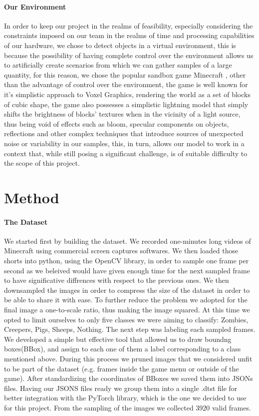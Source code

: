 \documentclass[10pt,journal,cspaper,compsoc]{IEEEtran}
\begin{document}
    \paragraph*{Our Environment}
    In order to keep our project in the realms of feasibility, especially considering the constraints imposed on our team in the 
    realms of time and processing capabilities of our hardware, we chose to detect objects in a virtual environment, this is because 
    the possibility of having complete control over the environment allows us to artificially create scenarios from which we can gather 
    samples of a large quantity, for this reason, we chose the popular sandbox game Minecraft \cite{Mojang-Minecraft}, other than 
    the advantage of control over the environment, the game is well known for it's simplistic approach to Voxel Graphics, rendering 
    the world as a set of blocks of cubic shape, the game also possesses a simplistic lightning model that simply shifts the brightness
    of blocks' textures when in the vicinity of a light source, thus being void of effects such as bloom, specular components on objects,
    reflections and other complex techniques that introduce sources of unexpected noise or variability in our samples, this, in turn, 
    allows our model to work in a context that, while still posing a significant challenge, is of suitable difficulty to the scope of 
    this project.

    \section{Method}
    \paragraph*{The Dataset}
    We started first by building the dataset. We recorded one-minutes long videos of Minecraft using commercial screen captures softwares. We then loaded those shorts into python, using the OpenCV library, in order to sample one frame per second as we 
    beleived would have given enough time for the next sampled frame to have significative diffrences with respect to the previous ones. We then downsampled the images in order to compress the size of the dataset in order to be able to share it with ease. To further 
    reduce the problem we adopted for the final image a one-to-scale ratio, thus making the image squared. At this time we opted to limit ourselves to only five classes we were aiming to classify: Zombies, Creepers, Pigs, Sheeps, Nothing. 
    The next step was labeling each sampled frames. We developed a simple but effective tool that allowed us to draw boundng boxes(BBox), and assign to each one of them a label corresponding to a class mentioned above. During this process we pruned images that we considered
    unfit to be part of the dataset (e.g. frames inside the game menu or outside of the game). After standardizing the coordinates of BBoxes we saved them into JSONs files. Having our JSONS files ready we group them into a single .dtst file for better integration with the PyTorch
    library, which is the one we decided to use for this project. From the sampling of the images we collected 3920 valid frames. 
    
\end{document}
